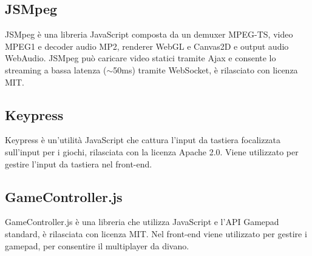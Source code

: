 \subsection{JSMpeg}
JSMpeg è una libreria JavaScript composta da un demuxer MPEG-TS, video MPEG1 e decoder audio MP2, renderer WebGL e Canvas2D e output audio WebAudio. JSMpeg può caricare video statici tramite Ajax e consente lo streaming a bassa latenza ($\sim$50ms) tramite WebSocket, è rilasciato con licenza MIT\cite{JSMpeg}.

\subsection{Keypress}
Keypress è un'utilità JavaScript che cattura l'input da tastiera focalizzata sull'input per i giochi, rilasciata con la licenza Apache 2.0. Viene utilizzato per gestire l'input da tastiera nel front-end\cite{Keypress}.

\subsection{GameController.js}
GameController.js è una libreria che utilizza JavaScript e l'API Gamepad standard, è rilasciata con licenza MIT. Nel front-end viene utilizzato per gestire i gamepad, per consentire il multiplayer da divano\cite{gameController_js}.